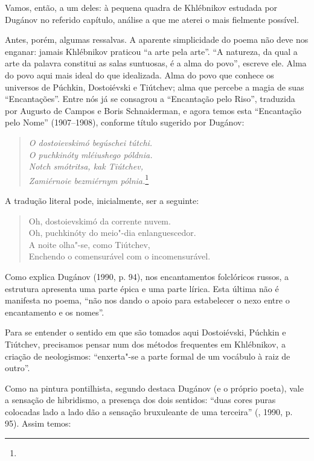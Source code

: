 Vamos, então, a um deles: à pequena quadra de Khlébnikov estudada por
Dugánov no referido capítulo, análise a que me aterei o mais fielmente
possível.

Antes, porém, algumas ressalvas. A aparente simplicidade do poema não
deve nos enganar: jamais Khlébnikov praticou ``a arte pela arte''. ``A
natureza, da qual a arte da palavra constitui as salas suntuosas, é a
alma do povo'', escreve ele. Alma do povo aqui mais ideal do que
idealizada. Alma do povo que conhece os universos de Púchkin,
Dostoiévski e Tiútchev; alma que percebe a magia de suas
``Encantações''. Entre nós já se consagrou a ``Encantação pelo Riso'',
traduzida por Augusto de Campos e Boris Schnaiderman, e agora temos esta
``Encantação pelo Nome'' (1907--1908), conforme título sugerido por
Dugánov:

\begin{verse}
\emph{O dostoievskimó begúschei tútchi.} \\
\emph{O puchkinóty mléiushego póldnia.} \\
\emph{Notch smótritsa, kak Tiútchev,} \\
\emph{Zamiérnoie bezmiérnym pólnia.}\footnote{{}} 

\end{verse}

A tradução literal pode, inicialmente, ser a seguinte:

\begin{verse}
Oh, dostoievskimó da corrente nuvem. \\
Oh, puchkinóty do meio"-dia \qb{}enlanguescedor. \\
A noite olha"-se, como Tiútchev, \\
Enchendo o comensurável com o incomensurável.
\end{verse}

Como explica Dugánov (1990, p. 94), nos encantamentos folclóricos
russos, a estrutura apresenta uma parte épica e uma parte lírica. Esta
última não é manifesta no poema, ``não nos dando o apoio para
estabelecer o nexo entre o encantamento e os nomes''.

Para se entender o sentido em que são tomados aqui Dostoiévski, Púchkin
e Tiútchev, precisamos pensar num dos métodos frequentes em Khlébnikov,
a criação de neologismos: ``enxerta"-se a parte formal de um vocábulo à
raiz de outro''.

Como na pintura pontilhista, segundo destaca Dugánov (e o próprio poeta), vale a sensação de hibridismo, a
presença dos dois sentidos: ``duas cores puras colocadas lado a lado dão a
sensação bruxuleante de uma terceira'' (, 1990, p. 95). Assim temos:

